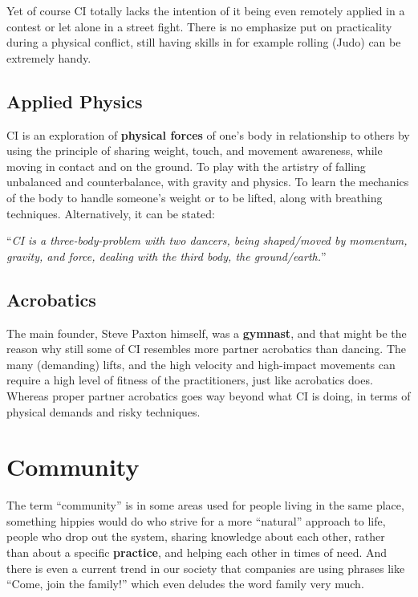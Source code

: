 Yet of course CI totally lacks the intention of it being even remotely applied in a contest or let alone in a street fight.
There is no emphasize put on practicality during a physical conflict, still having skills in for example rolling (Judo) can be extremely handy.

\subsection{Applied Physics}\label{subsec:applied-physics}

CI is an exploration of \textbf{physical forces} of one's body in relationship to others by using the principle of sharing weight, touch, and movement awareness, while moving in contact and on the ground.
To play with the artistry of falling unbalanced and counterbalance, with gravity and physics.
To learn the mechanics of the body to handle someone's weight or to be lifted, along with breathing techniques.
Alternatively, it can be stated:

\begin{center}
	``\textit{CI is a three-body-problem with two dancers, being shaped/moved by momentum, gravity, and force, dealing with the third body, the ground/earth.}''
\end{center}

\subsection{Acrobatics}\label{subsec:acrobatics}

The main founder, Steve Paxton himself, was a \textbf{gymnast}, and that might be the reason why still some of CI resembles more partner acrobatics than dancing.
The many (demanding) lifts, and the high velocity and high-impact movements can require a high level of fitness of the practitioners, just like acrobatics does.
Whereas proper partner acrobatics goes way beyond what CI is doing, in terms of physical demands and risky techniques.

\section{Community}\label{sec:community}

The term ``community'' is in some areas used for people living in the same place, something hippies would do who strive for a more ``natural'' approach to life, people who drop out the system, sharing knowledge about each other, rather than about a specific \textbf{practice}, and helping each other in times of need.
And there is even a current trend in our society that companies are using phrases like ``Come, join the family!'' which even deludes the word family very much.

